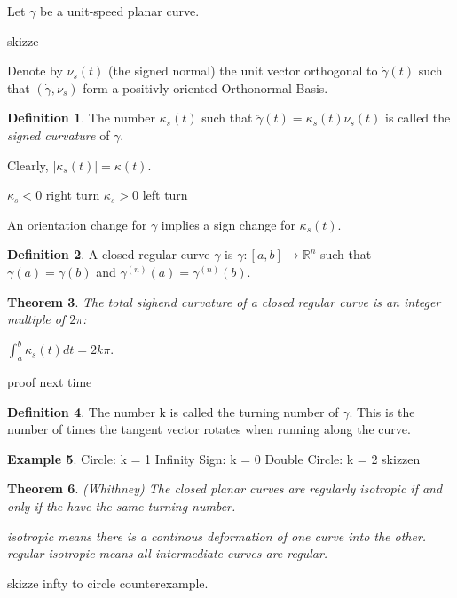 \documentclass[a4paper,11pt,notitlepage,fullpage]{paper}
\theoremstyle{plain}
\newtheorem{thm}{Theorem}[section] %
\theoremstyle{definition}
\newtheorem{defn}[thm]{Definition} %
\newtheorem{exmp}[thm]{Example} %
\begin{document}
Let $\gamma$ be a unit-speed planar curve.

skizze

Denote by $\nu_s(t)$ (the signed normal) the unit vector orthogonal to $\dot\gamma(t)$ such that $(\dot\gamma, \nu_s)$ form a positivly oriented Orthonormal Basis.


\begin{defn}
The number $\kappa_s(t)$ such that $\ddot\gamma(t) = \kappa_s(t) \nu_s(t)$ is called the \emph{signed curvature} of $\gamma$.
\end{defn}

Clearly, $|\kappa_s(t)| = \kappa(t)$.

$\kappa_s < 0$ right turn
$\kappa_s > 0$ left turn

An orientation change for $\gamma$ implies a sign change for $\kappa_s(t)$.

\begin{defn}
A closed regular curve $\gamma$ is $\gamma : [a,b] \to \mathbb R^n$ such that $\gamma(a) = \gamma(b)$ and $\gamma^{(n)}(a) = \gamma^{(n)}(b)$.
\end{defn}

\begin{thm}
The total sighend curvature of a closed regular curve is an integer multiple of $2\pi$:

$\int_a^b \kappa_s(t) dt = 2k\pi.$
\end{thm}

proof next time

\begin{defn}
The number k is called the turning number of $\gamma$. This is the number of times the tangent vector rotates when running along the curve.
\end{defn}

\begin{exmp}
Circle:
k = 1
Infinity Sign:
k = 0
Double Circle:
k = 2
skizzen
\end{exmp}

\begin{thm}
(Whithney) The closed planar curves are regularly isotropic if and only if the have the same turning number.

isotropic means there is a continous deformation of one curve into the other. regular isotropic means all intermediate curves are regular.
\end{thm}

skizze infty to circle counterexample.
\end{document}
